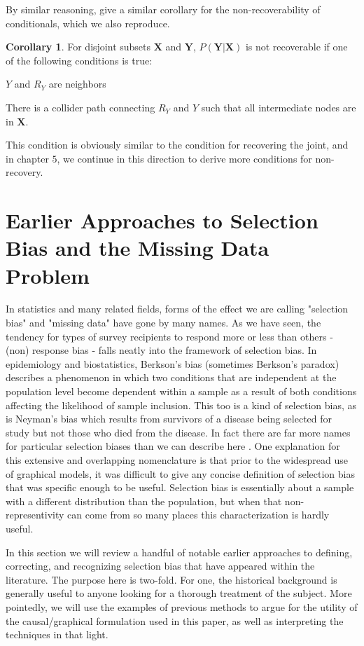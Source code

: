 \documentclass[12pt,twoside]{reedthesis}
\theoremstyle{definition}
\newtheorem{corollary}{Corollary}[section]
\begin{document}
By similar reasoning, \cite{Mohan_2014} give a similar corollary for the non-recoverability of conditionals, which we also reproduce.

\begin{corollary}
For disjoint subsets $\mathbf{X}$ and $\mathbf{Y}$,  $P(\mathbf{Y} | \mathbf{X})$ is not recoverable if one of the following conditions is true:
\item $Y$ and $R_Y$ are neighbors

\item There is a collider path connecting $R_Y$ and $Y$ such that all intermediate nodes are in $\mathbf{X}$.
\end{corollary}

This condition is obviously similar to the condition for recovering the joint, and in chapter $5$, we continue in this direction to derive more conditions for non-recovery.

\chapter{Earlier Approaches to Selection Bias and the Missing Data Problem}

In statistics and many related fields, forms of the effect we are calling "selection bias" and "missing data" have gone by many names. As we have seen,  the tendency for types of survey recipients to respond more or less than others - (non) response bias - falls neatly into the framework of selection bias. In epidemiology and biostatistics, Berkson's bias (sometimes Berkson's paradox) describes a phenomenon in which two conditions that are independent at the population level become dependent within a sample as a result of both conditions affecting the likelihood of sample inclusion. This too is a kind of selection bias, as is Neyman's bias which results from survivors of a disease being selected for study but not those who died from the disease. In fact there are far more names for particular selection biases than we can describe here \citep{Delgado_2008}. One explanation for this extensive and overlapping nomenclature is that prior to the widespread use of graphical models, it was difficult to give any concise definition of selection bias that was specific enough to be useful. Selection bias is essentially about a sample with a different distribution than the population, but when that non-representivity can come from so many places this characterization is hardly useful.

In this section we will review a handful of notable earlier approaches to defining, correcting, and recognizing selection bias that have appeared within the literature. The purpose here is two-fold. For one, the historical background is generally useful to anyone looking for a thorough treatment of the subject. More pointedly, we will use the examples of previous methods to argue for the utility of the causal/graphical formulation used in this paper, as well as interpreting the techniques in that light.
\end{document}

